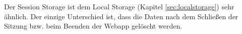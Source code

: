 
Der Session Storage ist dem Local Storage (Kapitel \ref{sec:localstorage}) sehr ähnlich. 
Der einzige Unterschied ist, dass die Daten nach dem Schließen der Sitzung bzw. beim Beenden der Webapp gelöscht werden.


